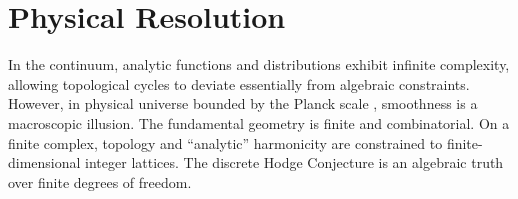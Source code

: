 \documentclass[12pt, a4paper]{article}
\theoremstyle{plain}
\theoremstyle{definition}
\begin{document}
\section{Physical Resolution}

In the continuum, analytic functions and distributions exhibit infinite complexity,
allowing topological cycles to deviate essentially from algebraic constraints.
However, in physical universe bounded by the Planck scale \citep{Rovelli2004},
smoothness is a macroscopic illusion. The fundamental geometry is finite and
combinatorial. On a finite complex, topology and ``analytic'' harmonicity are
constrained to finite-dimensional integer lattices. The discrete Hodge Conjecture
is an algebraic truth over finite degrees of freedom.


\vspace{2em}
\noindent\hrulefill
\vspace{1em}







\vspace{3em}
\noindent\hrulefill
\vspace{1em}
\end{document}
